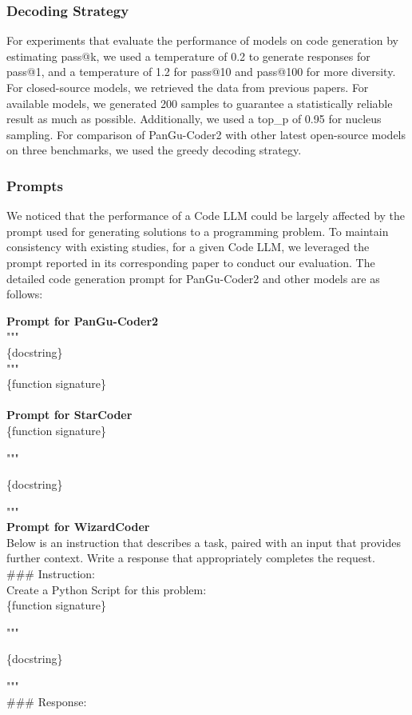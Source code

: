 \documentclass{article}
\newcommand{\pgcoder}{PanGu-Coder2\xspace}
\begin{document}
\subsubsection{Decoding Strategy} For experiments that evaluate the performance of models on code generation by estimating pass@k, we used a temperature of 0.2 to generate responses for pass@1, and a temperature of 1.2 for pass@10 and pass@100 for more diversity. For closed-source models, we retrieved the data from previous papers. For available models, we generated 200 samples to guarantee a statistically reliable result as much as possible. Additionally, we used a top\_p of 0.95 for nucleus sampling. For comparison of \pgcoder with other latest open-source models on three benchmarks, we used the greedy decoding strategy.

\subsubsection{Prompts} We noticed that the performance of a Code LLM could be largely affected by the prompt used for generating solutions to a programming problem. To maintain consistency with existing studies, for a given Code LLM, we leveraged the prompt reported in its corresponding paper to conduct our evaluation. The detailed code generation prompt for \pgcoder and other models are as follows:

\begin{tcolorbox}[left=2pt,right=2pt,top=0pt,bottom=0pt]
\textbf{Prompt for \pgcoder}\\
"""\\
\{docstring\}\\
"""\\
\{function signature\}\\
\\
\textbf{Prompt for StarCoder}\\
\{function signature\}

\hspace{1.5em}"""

\hspace{1.5em}\{docstring\}

\hspace{1.5em}"""\\

\textbf{Prompt for WizardCoder}\\
Below is an instruction that describes a task, paired with an input that provides further context. Write a response that appropriately completes the request. \\
\#\#\# Instruction:\\
Create a Python Script for this problem:\\
\{function signature\}

\hspace{1.5em}"""

\hspace{1.5em}\{docstring\}

\hspace{1.5em}"""\\

\#\#\# Response:
\end{tcolorbox}
\end{document}
